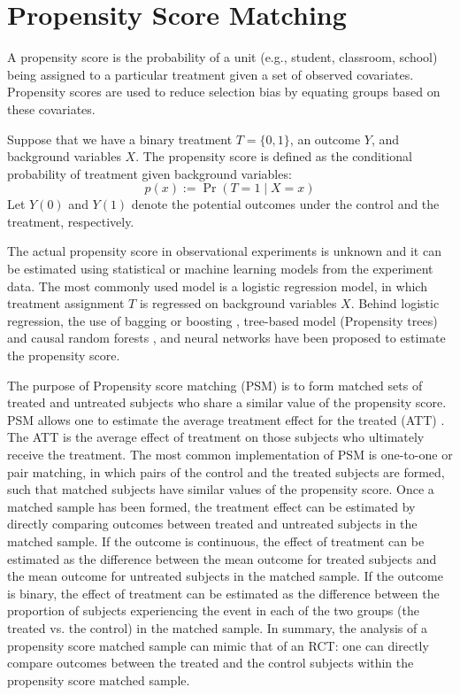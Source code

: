 \documentclass{article}
\begin{document}
\section{Propensity Score Matching}
A propensity score \cite{rosenbaum1983central} is the probability of a unit (e.g., student,
classroom, school) being assigned to a particular treatment given a
set of observed covariates. Propensity scores are used to reduce
selection bias by equating groups based on these covariates.

Suppose that we have a binary treatment $T=\{0,1\}$, an outcome $Y$, and
background variables $X$. The propensity score is defined as the
conditional probability of treatment given background variables:
$$p(x):= \Pr(T=1 \mid X=x)$$
Let $Y(0)$ and $Y(1)$ denote the potential outcomes under the control
and the treatment, respectively.

The actual propensity score in observational experiments is
unknown and it can be estimated using statistical or machine
learning models from the experiment data. The most commonly used model
is a logistic regression model, in which treatment assignment $T$ is
regressed on background variables $X$. Behind logistic regression, the
use of bagging or boosting \cite{Lee2010-zr}, tree-based model
(Propensity trees) and causal random forests
\cite{wager2015estimation}, and neural networks
\cite{setoguchi2008evaluating} have been proposed to estimate the
propensity score.

The purpose of Propensity score matching (PSM) is to form matched sets of treated and
untreated subjects who share a similar value of the propensity
score. PSM allows one to estimate the average treatment effect for the
treated (ATT) \cite{imbens2004nonparametric}. The ATT is the average effect of treatment on those
subjects who ultimately receive the treatment. The most common
implementation of PSM is one-to-one or pair matching, in which pairs
of the control and the treated subjects are formed, such that matched
subjects have similar values of the propensity score. Once a matched
sample has been formed, the treatment effect can be estimated by
directly comparing outcomes between treated and untreated subjects in
the matched sample. If the outcome is continuous, the effect of
treatment can be estimated as the difference between the mean outcome
for treated subjects and the mean outcome for untreated subjects in
the matched sample. If the outcome is binary, the effect of treatment
can be estimated as the difference between the proportion of subjects
experiencing the event in each of the two groups (the treated
vs. the control) in the matched sample. In summary, the analysis of a propensity score matched sample can mimic that of an
RCT: one can directly compare outcomes between the treated and the control
subjects within the propensity score matched sample. 
\end{document}
